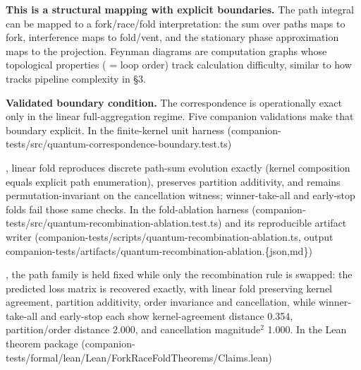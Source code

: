\documentclass[
]{article}
\begin{document}
\textbf{This is a structural mapping with explicit boundaries.} The path
integral can be mapped to a fork/race/fold interpretation: the sum over
paths maps to fork, interference maps to fold/vent, and the stationary
phase approximation maps to the projection. Feynman diagrams are
computation graphs whose topological properties ( = loop order) track
calculation difficulty, similar to how tracks pipeline complexity in §3.

\textbf{Validated boundary condition.} The correspondence is
operationally exact only in the linear full-aggregation regime. Five
companion validations make that boundary explicit. In the finite-kernel
unit harness
(companion-tests/src/quantum-correspondence-boundary.test.ts)

, linear fold reproduces discrete path-sum evolution exactly (kernel
composition equals explicit path enumeration), preserves partition
additivity, and remains permutation-invariant on the cancellation
witness; winner-take-all and early-stop folds fail those same checks. In
the fold-ablation harness
(companion-tests/src/quantum-recombination-ablation.test.ts) and its
reproducible artifact writer
(companion-tests/scripts/quantum-recombination-ablation.ts, output
companion-tests/artifacts/quantum-recombination-ablation.\{json,md\})

, the path family is held fixed while only the recombination rule is
swapped: the predicted loss matrix is recovered exactly, with linear
fold preserving kernel agreement, partition additivity, order invariance
and cancellation, while winner-take-all and early-stop each show
kernel-agreement distance 0.354, partition/order distance 2.000, and
cancellation magnitude\(^2\) 1.000. In the Lean theorem package
(companion-tests/formal/lean/Lean/ForkRaceFoldTheorems/Claims.lean)
\end{document}
